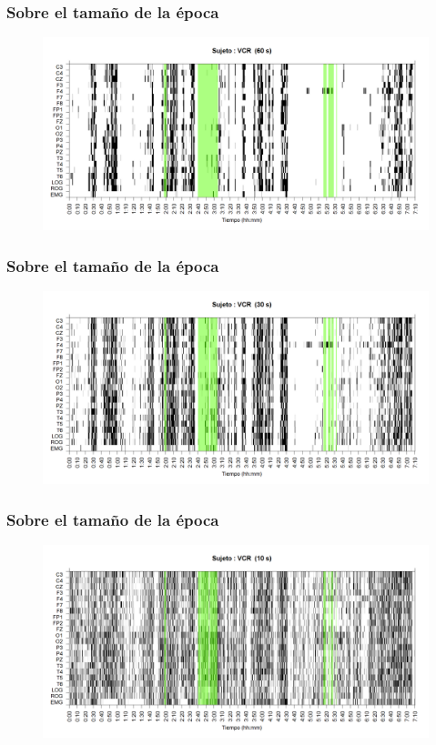 \documentclass{beamer}
\begin{document}
\begin{frame}\frametitle{Sobre el tama\~no de la \'epoca}
\begin{figure}
\centering
\includegraphics[width=0.9\linewidth]
{./p_170511/VCNNS1_est_60.png} 
\end{figure}
\end{frame}


\begin{frame}\frametitle{Sobre el tama\~no de la \'epoca}
\begin{figure}
\centering
\includegraphics[width=0.9\linewidth]
{./p_170511/VCNNS1_est_30.png} 
\end{figure}
\end{frame}


\begin{frame}\frametitle{Sobre el tama\~no de la \'epoca}
\begin{figure}
\centering
\includegraphics[width=0.9\linewidth]
{./p_170511/VCNNS1_est_10.png} 
\end{figure}
\end{frame}
\end{document}

